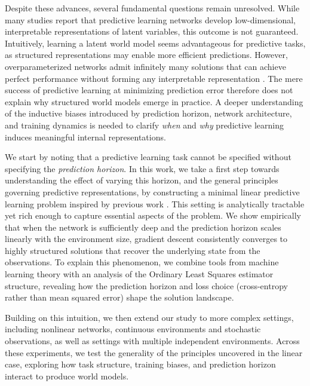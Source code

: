 \documentclass{article}
\begin{document}
Despite these advances, several fundamental questions remain unresolved. While many studies report that predictive learning networks develop low-dimensional, interpretable representations of latent variables, this outcome is not guaranteed. Intuitively, learning a latent world model seems advantageous for predictive tasks, as structured representations may enable more efficient predictions. However, overparameterized networks admit infinitely many solutions that can achieve perfect performance without forming any interpretable representation \citep{frankle2018lottery, zhang2016understanding, nguyen2017loss}. The mere success of predictive learning at minimizing prediction error therefore does not explain why structured world models emerge in practice. A deeper understanding of the inductive biases introduced by prediction horizon, network architecture, and training dynamics is needed to clarify \emph{when} and \emph{why} predictive learning induces meaningful internal representations.

We start by noting that a predictive learning task cannot be specified without specifying the \emph{prediction horizon}. In this work, we take a first step towards understanding the effect of varying this horizon, and the general principles governing predictive representations, by constructing a minimal linear predictive learning problem inspired by previous work \cite{recanatesi2021predictive}. This setting is analytically tractable yet rich enough to capture essential aspects of the problem. We show empirically that when the network is sufficiently deep and the prediction horizon scales linearly with the environment size, gradient descent consistently converges to highly structured solutions that recover the underlying state from the observations. To explain this phenomenon, we combine tools from machine learning theory with an analysis of the Ordinary Least Squares estimator structure, revealing how the prediction horizon and loss choice (cross-entropy rather than mean squared error) shape the solution landscape.  

Building on this intuition, we then extend our study to more complex settings, including nonlinear networks, continuous environments and stochastic observations, as well as settings with multiple independent environments. Across these experiments, we test the generality of the principles uncovered in the linear case, exploring how task structure, training biases, and prediction horizon interact to produce world models.  
\end{document}
